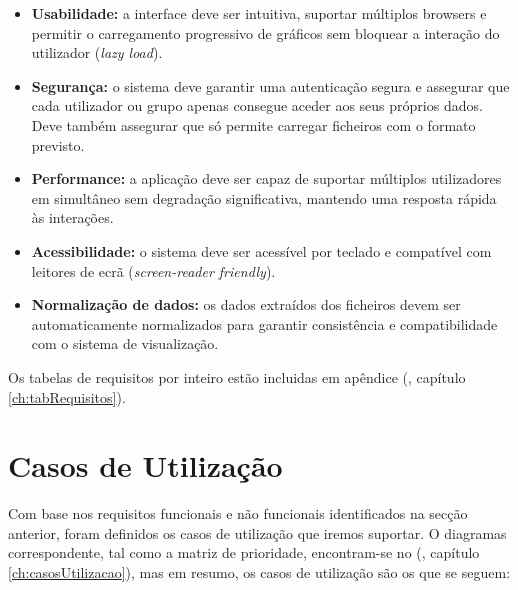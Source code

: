 \begin{itemize}
    \item \textbf{Usabilidade:} a interface deve ser intuitiva, suportar múltiplos browsers e permitir o carregamento progressivo de gráficos sem bloquear a interação do utilizador (\textit{lazy load}).
    
    \item \textbf{Segurança:} o sistema deve garantir uma autenticação segura e assegurar que cada utilizador ou grupo apenas consegue aceder aos seus próprios dados. Deve também assegurar que só permite carregar ficheiros com o formato previsto.
    
    \item \textbf{Performance:} a aplicação deve ser capaz de suportar múltiplos utilizadores em simultâneo sem degradação significativa, mantendo uma resposta rápida às interações.
    
    \item \textbf{Acessibilidade:} o sistema deve ser acessível por teclado e compatível com leitores de ecrã (\textit{screen-reader friendly}).

    \item \textbf{Normalização de dados:} os dados extraídos dos ficheiros devem ser automaticamente normalizados para garantir consistência e compatibilidade com o sistema de visualização.

\end{itemize}

Os tabelas de requisitos por inteiro estão incluidas em apêndice (\cf, capítulo \ref{ch:tabRequisitos}).

\section{Casos de Utilização}

Com base nos requisitos funcionais e não funcionais identificados na secção anterior, foram definidos os casos de utilização que iremos suportar. O diagramas correspondente, tal como a matriz de prioridade, encontram-se no (\cf, capítulo \ref{ch:casosUtilizacao}), mas em resumo, os casos de utilização são os que se seguem:

